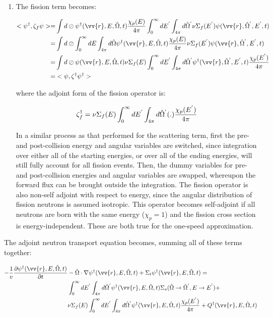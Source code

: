 \documentclass[10pt]{article}
\newcommand{\hO}{\hat{\Omega}}
\newcommand{\spa}{(\vv{r}, E, \hO, t)}
\begin{document}
\begin{flushleft}
\begin{enumerate}
\item The fission term becomes:

\begin{equation}
\begin{aligned}
<\psi^\dagger,\zeta_f\psi>=& \int d\oslash\psi^\dagger\spa \frac{\chi_p(E)}{4\pi}\int_0^\infty dE^{'}\int_{4\pi}d\hO  ^{'}\nu\Sigma_f(E^{'})\psi(\vv{r},\hO  ^{'},E^{'},t)\\
=& \int d\oslash\int_0^\infty dE\int_{4\pi}d\hO  \psi^\dagger\spa \frac{\chi_p(E)}{4\pi}\nu\Sigma_f(E^{'})\psi(\vv{r},\hO  ^{'},E^{'},t)\\
=& \int d\oslash\psi\spa \nu\Sigma_f(E)\int_0^\infty dE^{'}\int_{4\pi}d\hO  ^{'}\psi^\dagger(\vv{r},\hO  ^{'},E^{'},t)\frac{\chi_p(E^{'})}{4\pi}\\
=& <\psi,\zeta^\dagger\psi^\dagger>\\
\end{aligned}
\end{equation}

where the adjoint form of the fission operator is:

\begin{equation}
\zeta_f^\dagger=\nu\Sigma_f(E)\int_0^\infty dE^{'}\int_{4\pi}d\hO  ^{'}(.)\frac{\chi_p(E^{'})}{4\pi}\\
\end{equation}

In a similar process as that performed for the scattering term, first the pre- and post-collision energy and angular variables are switched, since integration over either all of the starting energies, or over all of the ending energies, will still fully account for all fission events. Then, the dummy variables for pre- and post-collision energies and angular variables are swapped, whereupon the forward flux can be brought outside the integration. The fission operator is also non-self adjoint with respect to energy, since the angular distribution of fission neutrons is assumed isotropic. This operator becomes self-adjoint if all neutrons are born with the same energy (\(\chi_p=1\)) and the fission cross section is energy-independent. These are both true for the one-speed approximation.
\end{enumerate}

The adjoint neutron transport equation becomes, summing all of these terms together:

\begin{equation} %
\begin{aligned}
-\frac{1}{v}\frac{\partial\psi^\dagger\spa }{\partial t}
& -\hO  \cdot\nabla\psi^\dagger\spa 
+\Sigma_t\psi^\dagger\spa =\\
& \int_0^\infty dE^{'}\int_{4\pi}d\hO  ^{'}\psi^\dagger\spa \Sigma_s(\hO  \rightarrow\hO  ^{'}, E\rightarrow E^{'})+\\
& \nu\Sigma_f(E)\int_0^\infty dE^{'}\int_{4\pi}d\hO  ^{'}\psi^\dagger\spa \frac{\chi_p(E^{'})}{4\pi} + Q^\dagger\spa \\
\end{aligned}
\end{equation}


\end{flushleft}
\end{document}
